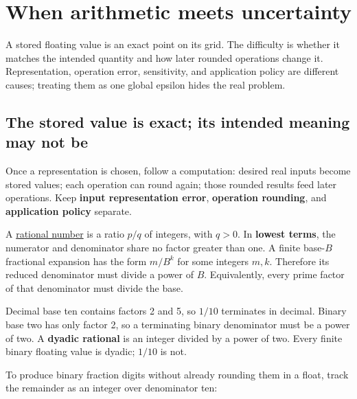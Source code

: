 \section{When arithmetic meets uncertainty}\label{01-foundations-i-ch001-when-arithmetic-meets-uncertainty}

A stored floating value is an exact point on its grid. The difficulty is whether it matches the intended quantity and how later rounded operations change it. Representation, operation error, sensitivity, and application policy are different causes; treating them as one global epsilon hides the real problem.

\subsection{The stored value is exact; its intended meaning may not be}\label{01-foundations-i-ch001-the-stored-value-is-exact-its-intended-meaning-may-not-be}

Once a representation is chosen, follow a computation: desired real inputs become stored values; each operation can round again; those rounded results feed later operations. Keep \textbf{input representation error}, \textbf{operation rounding}, and \textbf{application policy} separate.

A \hyperref[appendix-2a2f1b74bdd3]{rational number} is a ratio \(p/q\) of integers, with \(q>0\). In \textbf{lowest terms}, the numerator and denominator share no factor greater than one. A finite base-\(B\) fractional expansion has the form \(m/B^k\) for some integers \(m,k\). Therefore its reduced denominator must divide a power of \(B\). Equivalently, every prime factor of that denominator must divide the base.

Decimal base ten contains factors 2 and 5, so \(1/10\) terminates in decimal. Binary base two has only factor 2, so a terminating binary denominator must be a power of two. A \textbf{dyadic rational} is an integer divided by a power of two. Every finite binary floating value is dyadic; \(1/10\) is not.

To produce binary fraction digits without already rounding them in a float, track the remainder as an integer over denominator ten:


